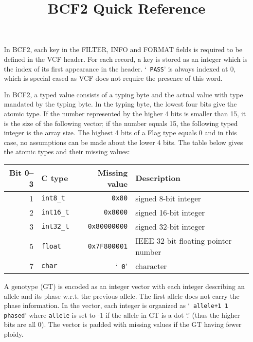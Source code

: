 \documentclass[10pt]{article}
\title{BCF2 Quick Reference}
\author{}
\date{}
\begin{document}
\maketitle

{\small
In BCF2, each key in the {\sf FILTER}, {\sf INFO} and {\sf FORMAT} fields is
required to be defined in the VCF header. For each record, a key is stored as
an integer which is the index of its first appearance in the header. `{\tt
PASS}' is always indexed at 0, which is special cased as VCF does not require
the presence of this word.

In BCF2, a typed value consists of a typing byte and the actual value with type
mandated by the typing byte. In the typing byte, the lowest four bits give the
atomic type. If the number represented by the higher 4 bits is smaller than 15,
it is the size of the following vector; if the number equals 15, the following
typed integer is the array size. The highest 4 bits of a {\sf Flag} type equals
0 and in this case, no assumptions can be made about the lower 4 bits. The
table below gives the atomic types and their
missing values:
\begin{center}
{\small\begin{tabular}{rlrl}
\hline
Bit 0--3 & C type & Missing value & Description \\
\hline
1 & {\tt int8\_t}   & {\tt 0x80}               & signed 8-bit integer \\
2 & {\tt int16\_t}  & {\tt 0x8000}             & signed 16-bit integer \\
3 & {\tt int32\_t}  & {\tt 0x80000000}         & signed 32-bit integer \\
5 & {\tt float}     & {\tt 0x7F800001}         & IEEE 32-bit floating pointer number \\
7 & {\tt char}      & `{\tt \char92 0}'        & character \\
\hline
\end{tabular}}
\end{center}

A genotype (GT) is encoded as an integer vector with each integer
describing an allele and its phase w.r.t. the previous allele. The first allele
does not carry the phase information. In the vector, each integer is organized
as `{\tt {} allele+1 1 phased}' where
{\tt allele} is set to -1 if the allele in GT is a dot `.' (thus the higher
bits are all 0). The vector is padded with missing values if the GT having fewer ploidy.
}
\end{document}
